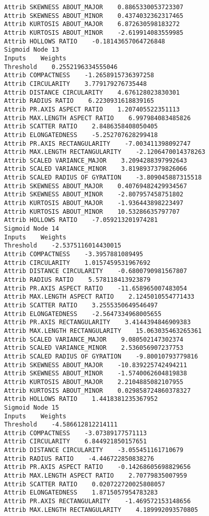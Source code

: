 \documentclass[
	article,			%
	11pt,				%
	oneside,			%
	a4paper,			%
	english,			%
	brazil,				%
	sumario=tradicional
	]{abntex2}
\begin{document}
\begin{lstlisting}
Attrib SKEWNESS ABOUT_MAJOR    0.8865330053723307
Attrib SKEWNESS ABOUT_MINOR    0.4374032362317465
Attrib KURTOSIS ABOUT_MAJOR    6.872630598183272
Attrib KURTOSIS ABOUT_MINOR    -2.619914083559985
Attrib HOLLOWS RATIO    -0.18143657064726848
Sigmoid Node 13
Inputs    Weights
Threshold    0.2552196334555046
Attrib COMPACTNESS    -1.2658915736397258
Attrib CIRCULARITY    3.779179276735448
Attrib DISTANCE CIRCULARITY    4.676128023830301
Attrib RADIUS RATIO    6.2230931618839165
Attrib PR.AXIS ASPECT RATIO    1.207405522351113
Attrib MAX.LENGTH ASPECT RATIO    6.997984083485826
Attrib SCATTER RATIO    2.8486358408050405
Attrib ELONGATEDNESS    -5.252707628299418
Attrib PR.AXIS RECTANGULARITY    -7.003411398092747
Attrib MAX.LENGTH RECTANGULARITY    -2.1206470014378263
Attrib SCALED VARIANCE_MAJOR    3.2094288397992643
Attrib SCALED VARIANCE_MINOR    3.8198937379826066
Attrib SCALED RADIUS OF GYRATION    -3.809045887315518
Attrib SKEWNESS ABOUT_MAJOR    0.40769482429934567
Attrib SKEWNESS ABOUT_MINOR    -2.807957458751802
Attrib KURTOSIS ABOUT_MAJOR    -1.936443898223497
Attrib KURTOSIS ABOUT_MINOR    10.53286635797707
Attrib HOLLOWS RATIO    -7.059213201974281
Sigmoid Node 14
Inputs    Weights
Threshold    -2.5375116014430015
Attrib COMPACTNESS    -3.3957881089495
Attrib CIRCULARITY    1.0157459531967692
Attrib DISTANCE CIRCULARITY    -0.6800790981567807
Attrib RADIUS RATIO    5.578118413923879
Attrib PR.AXIS ASPECT RATIO    -11.658965007483054
Attrib MAX.LENGTH ASPECT RATIO    2.1245010554771433
Attrib SCATTER RATIO    3.2555350649546497
Attrib ELONGATEDNESS    -2.5647334968005655
Attrib PR.AXIS RECTANGULARITY    3.4144394846909383
Attrib MAX.LENGTH RECTANGULARITY    15.063035463265361
Attrib SCALED VARIANCE_MAJOR    9.080502147302374
Attrib SCALED VARIANCE_MINOR    2.536056907237753
Attrib SCALED RADIUS OF GYRATION    -9.80010793779816
Attrib SKEWNESS ABOUT_MAJOR    -10.839225742494211
Attrib SKEWNESS ABOUT_MINOR    -1.5740062604819838
Attrib KURTOSIS ABOUT_MAJOR    2.2104885082107955
Attrib KURTOSIS ABOUT_MINOR    0.029858724860378327
Attrib HOLLOWS RATIO    1.4418381235367952
Sigmoid Node 15
Inputs    Weights
Threshold    -4.586612812214111
Attrib COMPACTNESS    -3.07389177571113
Attrib CIRCULARITY    6.844921850157651
Attrib DISTANCE CIRCULARITY    -3.055451161710679
Attrib RADIUS RATIO    -4.446722850838276
Attrib PR.AXIS ASPECT RATIO    -0.14268605698829656
Attrib MAX.LENGTH ASPECT RATIO    2.70779835007959
Attrib SCATTER RATIO    0.020722720025808057
Attrib ELONGATEDNESS    1.8715057954783283
Attrib PR.AXIS RECTANGULARITY    -1.469572153148656
Attrib MAX.LENGTH RECTANGULARITY    4.189992093570805

\end{lstlisting}
\end{document}

